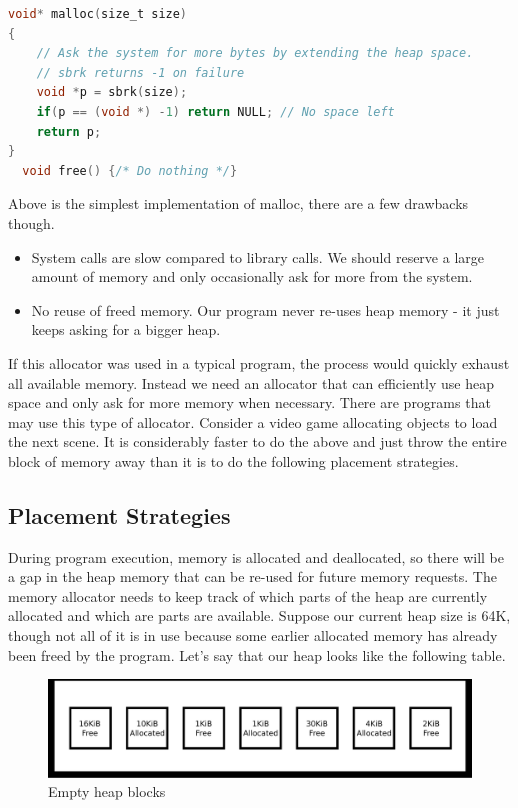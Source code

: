\begin{lstlisting}[language=C]
void* malloc(size_t size)
{
    // Ask the system for more bytes by extending the heap space.
    // sbrk returns -1 on failure
    void *p = sbrk(size);
    if(p == (void *) -1) return NULL; // No space left
    return p;
}
  void free() {/* Do nothing */}
\end{lstlisting}

Above is the simplest implementation of malloc, there are a few drawbacks though.

\begin{itemize}
\item System calls are slow compared to library calls.
  We should reserve a large amount of memory and only occasionally ask for more from the system.
\item No reuse of freed memory.
  Our program never re-uses heap memory - it just keeps asking for a bigger heap.
\end{itemize}

If this allocator was used in a typical program, the process would quickly exhaust all available memory.
Instead we need an allocator that can efficiently use heap space and only ask for more memory when necessary.
There are programs that may use this type of allocator.
Consider a video game allocating objects to load the next scene.
It is considerably faster to do the above and just throw the entire block of memory away than it is to do the following placement strategies.

\subsection{Placement Strategies}

During program execution, memory is allocated and deallocated, so there will be a gap in the heap memory that can be re-used for future memory requests.
The memory allocator needs to keep track of which parts of the heap are currently allocated and which are parts are available.
Suppose our current heap size is 64K, though not all of it is in use because some earlier allocated memory has already been freed by the program.
Let's say that our heap looks like the following table.

\begin{figure}[H]
\centering
\includegraphics[width=.9\textwidth]{malloc/drawings/heap_empty.eps}
\caption{Empty heap blocks}
\end{figure}

